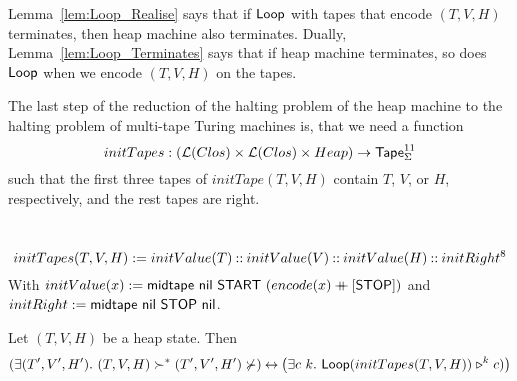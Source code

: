 Lemma~\ref{lem:Loop_Realise} says that if $\mathsf{Loop}$ with tapes that encode $(T,V,H)$ terminates, then heap machine also terminates.  Dually,
Lemma~\ref{lem:Loop_Terminates} says that if heap machine terminates, so does $\mathsf{Loop}$ when we encode $(T,V,H)$ on the tapes.

The last step of the reduction of the halting problem of the heap machine to the halting problem of multi-tape Turing machines is, that we need a
function
\[
  initTapes : \left(\mathcal{L}(Clos) \times \mathcal{L}(Clos) \times Heap\right) \rightarrow \mathsf{Tape}_\Sigma^{11}
\]
such that the first three tapes of $initTape(T,V,H)$ contain $T$, $V$, or $H$, respectively, and the rest tapes are right.

\begin{definition}[$initTapes$]
  \label{def:initTapes}
  ~
  \[
    initTapes(T,V,H) := initValue(T) \mathbin{::} initValue(V) \mathbin{::} initValue(H) \mathbin{::} initRight^8
  \]
  With $initValue(x) := \mathsf{midtape}~\mathsf{nil}~\mathsf{START}~(encode(x) \mathbin{+\mkern-10mu+} [\mathsf{STOP}])$ and $initRight := \mathsf{midtape}~\mathsf{nil}~\mathsf{STOP}~\mathsf{nil}$.
\end{definition}

\begin{theorem}
  \label{lem:HaltingProblem}
  Let $(T,V,H)$ be a heap state.  Then
  \[
    \left(\exists (T',V',H').~(T,V,H) \succ^* (T',V',H') \nsucc\right) \mathbin{\leftrightarrow} \left(\exists c~k.~\mathsf{Loop}(initTapes(T,V,H)) \mathrel{\triangleright}^k c)\right)
  \]
\end{theorem}







